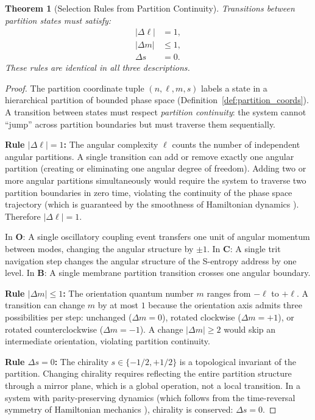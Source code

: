 \documentclass[twocolumn,10pt]{article}
\newtheorem{theorem}{Theorem}[section]
\theoremstyle{remark}
\newcommand{\CatO}{\mathbf{O}}
\newcommand{\CatC}{\mathbf{C}}
\newcommand{\CatB}{\mathbf{B}}
\begin{document}
\begin{theorem}[Selection Rules from Partition Continuity]
\label{thm:selection_rules}
Transitions between partition states must satisfy:
\begin{align}
|\Delta\ell| &= 1, \label{eq:sel_ell}\\
|\Delta m| &\leq 1, \label{eq:sel_m}\\
\Delta s &= 0. \label{eq:sel_s}
\end{align}
These rules are identical in all three descriptions.
\end{theorem}

\begin{proof}
The partition coordinate tuple $(n, \ell, m, s)$ labels a state in a hierarchical partition of bounded phase space (Definition~\ref{def:partition_coords}).
A transition between states must respect \emph{partition continuity}: the system cannot ``jump'' across partition boundaries but must traverse them sequentially.

\textbf{Rule $|\Delta\ell| = 1$:}
The angular complexity $\ell$ counts the number of independent angular partitions.
A single transition can add or remove exactly one angular partition (creating or eliminating one angular degree of freedom).
Adding two or more angular partitions simultaneously would require the system to traverse two partition boundaries in zero time, violating the continuity of the phase space trajectory (which is guaranteed by the smoothness of Hamiltonian dynamics \cite{arnold1989}).
Therefore $|\Delta\ell| = 1$.

In $\CatO$: A single oscillatory coupling event transfers one unit of angular momentum between modes, changing the angular structure by $\pm 1$.
In $\CatC$: A single trit navigation step changes the angular structure of the S-entropy address by one level.
In $\CatB$: A single membrane partition transition crosses one angular boundary.

\textbf{Rule $|\Delta m| \leq 1$:}
The orientation quantum number $m$ ranges from $-\ell$ to $+\ell$.
A transition can change $m$ by at most $1$ because the orientation axis admits three possibilities per step: unchanged ($\Delta m = 0$), rotated clockwise ($\Delta m = +1$), or rotated counterclockwise ($\Delta m = -1$).
A change $|\Delta m| \geq 2$ would skip an intermediate orientation, violating partition continuity.

\textbf{Rule $\Delta s = 0$:}
The chirality $s \in \{-1/2, +1/2\}$ is a topological invariant of the partition.
Changing chirality requires reflecting the entire partition structure through a mirror plane, which is a global operation, not a local transition.
In a system with parity-preserving dynamics (which follows from the time-reversal symmetry of Hamiltonian mechanics \cite{noether1918}), chirality is conserved: $\Delta s = 0$.


\end{proof}
\end{document}
